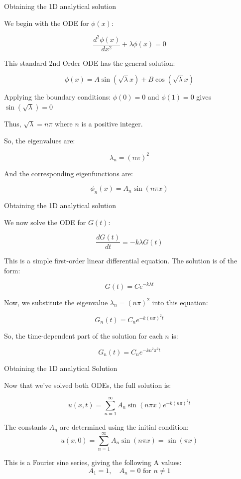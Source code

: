 \documentclass{beamer}
\begin{document}
\begin{frame}{Obtaining the 1D analytical solution}

We begin with the ODE for \( \phi(x) \):

\[
\frac{d^2 \phi(x)}{dx^2} + \lambda \phi(x) = 0
\]

This standard 2nd Order ODE has the general solution:

\[
\phi(x) = A \sin(\sqrt{\lambda} x) + B \cos(\sqrt{\lambda} x)
\]

Applying the boundary conditions:
\( \phi(0) = 0 \) and \( \phi(1) = 0 \) gives \( \sin(\sqrt{\lambda}) = 0 \)

Thus, \( \sqrt{\lambda} = n\pi \) where \( n \) is a positive integer.

So, the eigenvalues are:

\[
\lambda_n = (n\pi)^2
\]

And the corresponding eigenfunctions are:

\[
\phi_n(x) = A_n \sin(n\pi x)
\]

\end{frame}

\begin{frame}{Obtaining the 1D analytical solution}

We now solve the ODE for \( G(t) \):

\[
\frac{dG(t)}{dt} = -k \lambda G(t)
\]

This is a simple first-order linear differential equation. The solution is of the form:

\[
G(t) = C e^{-k \lambda t}
\]

Now, we substitute the eigenvalue \( \lambda_n = (n\pi)^2 \) into this equation:

\[
G_n(t) = C_n e^{-k (n\pi)^2 t}
\]

So, the time-dependent part of the solution for each \( n \) is:

\[
G_n(t) = C_n e^{-k n^2 \pi^2 t}
\]

\end{frame}

\begin{frame}{Obtaining the 1D analytical Solution}

Now that we’ve solved both ODEs, the full solution is:

\[
u(x,t) = \sum_{n=1}^{\infty} A_n \sin(n\pi x) e^{-k(n\pi)^2 t}
\]

The constants \( A_n \) are determined using the initial condition:
\[
u(x,0) = \sum_{n=1}^{\infty} A_n \sin(n\pi x) = \sin(\pi x)
\]

This is a Fourier sine series, giving the following A values:
\[
A_1 = 1, \quad A_n = 0 \text{ for } n \ne 1
\]

\end{frame}
\end{document}
